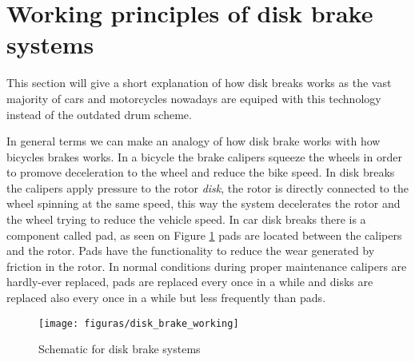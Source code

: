 \section{Working principles of disk brake systems}

		This section will give a short explanation of how disk breaks works as the vast majority of cars and motorcycles nowadays are equiped with this technology instead of the outdated drum scheme.
		\par
		In general terms we can make an analogy of how disk brake works with how bicycles brakes works. In a bicycle the brake calipers squeeze the wheels in order to promove deceleration to the wheel and reduce the bike speed. In disk breaks the calipers apply pressure to the rotor \textit{disk}, the rotor is directly connected to the wheel spinning at the same speed, this way the system decelerates the rotor and the wheel trying to reduce the vehicle speed. In car disk breaks there is a component called pad, as seen on Figure \ref{fig-working-of-disk-breaks} pads are located between the calipers and the rotor. Pads have the functionality to reduce the wear generated by friction in the rotor. In normal conditions during proper maintenance calipers are hardly-ever replaced, pads are replaced every once in a while and disks are replaced also every once in a while but less frequently than pads.

		\begin{figure}[htbp]
			\centering
				\texttt{[image: figuras/disk\_brake\_working]}
			\caption{Schematic for disk brake systems }%
			\label{fig-working-of-disk-breaks}
		\end{figure}
